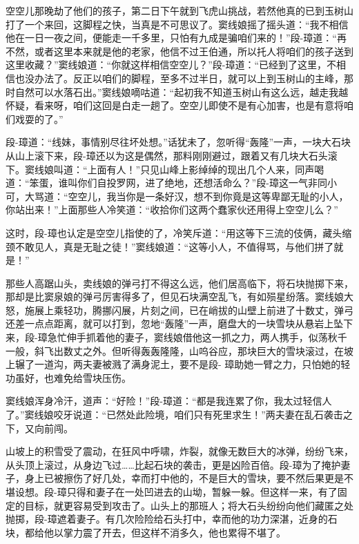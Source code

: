 \documentclass[12pt,oneside]{book}
\begin{document}
空空儿那晚劫了他们的孩子，第二日下午就到飞虎山挑战，若然他真的已到玉树山打了一个来回，这脚程之快，当真是不可思议了。窦线娘摇了摇头道：``我不相信他在一日一夜之间，便能走一千多里，只怕有九成是骗咱们来的！''段-璋道：``再不然，或者这里本来就是他的老家，他信不过王伯通，所以托人将咱们的孩子送到这里收藏？''窦线娘道：``你就这样相信空空儿？''段-璋道：``已经到了这里，不相信也没办法了。反正以咱们的脚程，至多不过半日，就可以上到玉树山的主峰，那时自然可以水落石出。''窦线娘嘀咕道：``起初我不知道玉树山有这么远，越走我越怀疑，看来呀，咱们这回是白走一趟了。空空儿即使不是有心加害，也是有意将咱们戏耍的了。''

段-璋道：``线妹，事情别尽往坏处想。''话犹未了，忽听得``轰隆''一声，一块大石块从山上滚下来，段-璋还以为这是偶然，那料刚刚避过，跟着又有几块大石头滚下。窦线娘叫道：``上面有人！''只见山峰上影绰绰的现出几个人来，同声喝道：``笨蛋，谁叫你们自投罗网，进了绝地，还想活命么？''段-璋这一气非同小可，大骂道：``空空儿，我当你是一条好汉，想不到你竟是这等卑鄙无耻的小人，你站出来！''上面那些人冷笑道：``收拾你们这两个蠢家伙还用得上空空儿么？''

这时，段-璋也认定是空空儿指使的了，冷笑斥道：``用这等下三流的伎俩，藏头缩颈不敢见人，真是无耻之徒！''窦线娘道：``这等小人，不值得骂，与他们拼了就是！''

那些人高踞山头，卖线娘的弹弓打不得这么远，他们居高临下，将石块抛掷下来，那却是比窦泉娘的弹弓厉害得多了，但见石块满空乱飞，有如殒星纷落。窦线娘大怒，施展上乘轻功，腾挪闪展，片刻之间，已在峭拔的山壁上前进了十数丈，弹弓还差一点点距离，就可以打到，忽地``轰隆''一声，磨盘大的一块雪块从悬岩上坠下来，段-璋急忙伸手抓着他的妻子，窦线娘借他这一抓之力，两人携手，似荡秋千一般，斜飞出数丈之外。但听得轰轰隆隆，山呜谷应，那块巨大的雪块滚过，在坡上辗了一道沟，两夫妻被溅了满身泥土，要不是段-
璋助她一臂之力，只怕她的轻功虽好，也难免给雪块压伤。

窦线娘浑身冷汗，道声：``好险！''段-璋道：``都是我连累了你，我太过轻信人了。''窦线娘咬牙说道：``已然处此险境，咱们只有死里求生！''两夫妻在乱石袭击之下，又向前闯。

山坡上的积雪受了震动，在狂风中呼啸，炸裂，就像无数巨大的冰弹，纷纷飞来，从头顶上滚过，从身边飞过\ldots\ldots 比起石块的袭击，更是凶险百倍。段-璋为了掩护妻子，身上已被擦伤了好几处，幸而打中他的，不是巨大的雪块，要不然后果更是不堪设想。段-璋只得和妻子在一处凹进去的山坳，暂躲一躲。但这样一来，有了固定的目标，就更容易受到攻击了。山头上的那班人；将大石头纷纷向他们藏匿之处抛掷，段-璋遮着妻子。有几次险险给石头打中，幸而他的功力深湛，近身的石块，都给他以掌力震了开去，但这样不消多久，他也累得不堪了。
\end{document}

